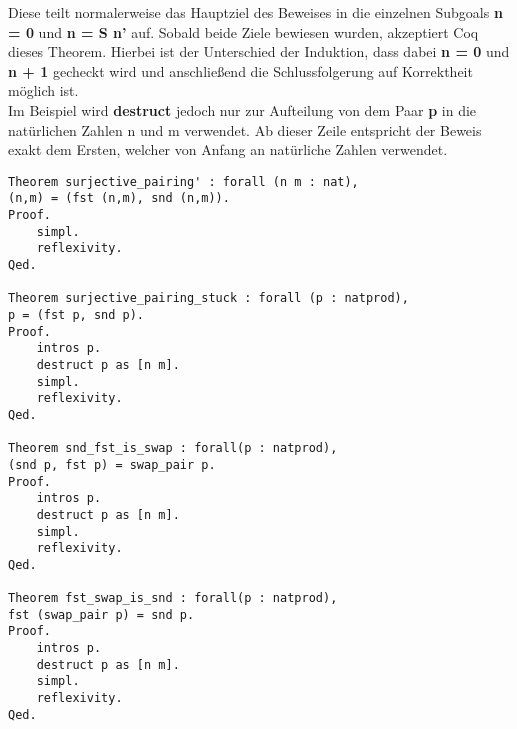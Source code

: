 Diese teilt normalerweise das Hauptziel des Beweises in die einzelnen Subgoals \textbf{n = 0} und \textbf{n = S n'} auf. Sobald beide Ziele bewiesen wurden, akzeptiert Coq dieses Theorem. Hierbei ist der Unterschied der Induktion, dass dabei \textbf{n = 0} und \textbf{n + 1} gecheckt wird und anschließend die Schlussfolgerung auf Korrektheit möglich ist.\\
Im Beispiel wird \textbf{destruct} jedoch nur zur Aufteilung von dem Paar \textbf{p} in die natürlichen Zahlen n und m verwendet.
Ab dieser Zeile entspricht der Beweis exakt dem Ersten, welcher von Anfang an natürliche Zahlen verwendet.

\begin{lstlisting}[language=coq,firstnumber=1,caption=Coq Beweise für Paar Funktionen (PaperPair.v),label=lst:practical-proof]
Theorem surjective_pairing' : forall (n m : nat),
(n,m) = (fst (n,m), snd (n,m)).
Proof.
	simpl.
	reflexivity. 
Qed.

Theorem surjective_pairing_stuck : forall (p : natprod),
p = (fst p, snd p).
Proof.
	intros p.
	destruct p as [n m].  
	simpl.
	reflexivity.
Qed.

Theorem snd_fst_is_swap : forall(p : natprod),
(snd p, fst p) = swap_pair p.
Proof.
	intros p.
	destruct p as [n m].
	simpl.
	reflexivity.
Qed.

Theorem fst_swap_is_snd : forall(p : natprod),
fst (swap_pair p) = snd p.
Proof.
	intros p.
	destruct p as [n m].
	simpl.
	reflexivity.
Qed.
\end{lstlisting}

